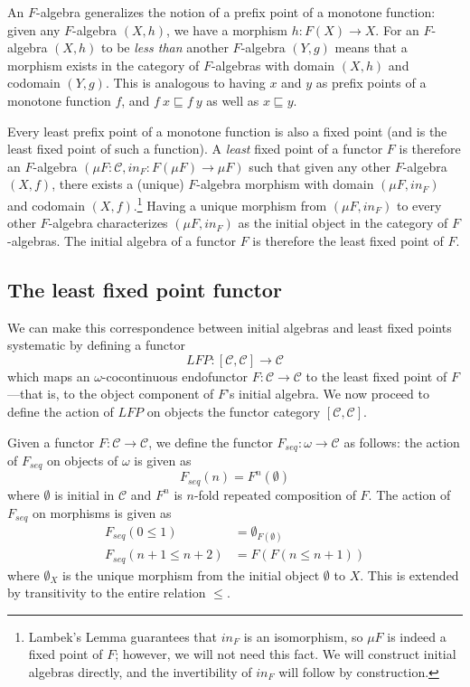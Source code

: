 \documentclass{msthesis}
\theoremstyle{definition}
\newcommand{\mcC}{\mathcal{C}}
\begin{document}
An $F$-algebra generalizes the notion of a prefix point of a monotone function: given any $F$-algebra $(X, h)$, we have a morphism $h : F(X) \to X$.  For an $F$-algebra $(X, h)$ to be \textit{less than} another $F$-algebra $(Y, g)$ means that a morphism exists in the category of $F$-algebras with domain $(X, h)$ and codomain $(Y , g)$.  This is analogous to having $x$ and $y$ as prefix points of a monotone function $f$, and $f\ x \sqsubseteq f\ y$ as well as $x \sqsubseteq y$.  

Every least prefix point of a monotone function is also a fixed point (and is the least fixed point of such a function).  A \textit{least} fixed point of a functor $F$ is therefore an $F$-algebra $(\mu F : \mcC, in_F : F(\mu F) \to \mu F)$ such that given any other $F$-algebra $(X, f)$, there exists a (unique) $F$-algebra morphism with domain $(\mu F, in_F)$ and codomain $(X, f)$.\footnote{Lambek's Lemma guarantees that $in_F$ is an isomorphism, so $\mu F$ is indeed a fixed point of $F$; however, we will not need this fact. We will construct initial algebras directly, and the invertibility of $in_F$ will follow by construction.} Having a unique morphism from $(\mu F, in_F)$ to every other $F$-algebra characterizes $(\mu F, in_F)$ as the initial object in the category of $F$-algebras.  The initial algebra of a functor $F$ is therefore the least fixed point of $F$.

\subsection{The least fixed point functor}\label{sec:lfp}

We can make this correspondence between initial algebras and least fixed points systematic by defining a functor
\[ LFP : [\mcC,\mcC] \to \mcC \]
which maps an $\omega$-cocontinuous endofunctor $F : \mcC \to \mcC$ to the least fixed point of $F$—that is, to the object component of $F$’s initial algebra.  We now proceed to define the action of $LFP$ on objects the functor category $[\mcC,\mcC]$.

Given a functor $F : \mcC \to \mcC$, we define the functor $F_{seq} : \omega \to \mcC$ as follows: the action of $F_{seq}$ on objects of $\omega$ is given as
\[ F_{seq}(n) = F^n(\emptyset) \]
where $\emptyset$ is initial in $\mcC$ and $F^n$ is $n$-fold repeated composition of $F$.  The action of $F_{seq}$ on morphisms is given as
\begin{align*}
    F_{seq}(0 \le 1) &= \emptyset_{F(\emptyset)} \\
    F_{seq}(n+1 \le n+2) &= F(F(n \le n+1))
\end{align*}
where $\emptyset_{X}$ is the unique morphism from the initial object $\emptyset$ to $X$.
This is extended by transitivity to the entire relation $\le$.
\end{document}
